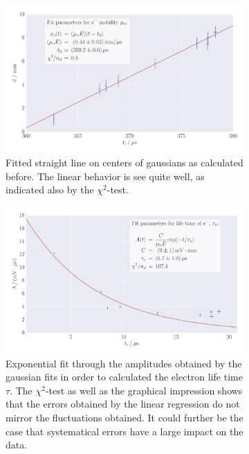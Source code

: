\begin{figure}
    \centering
    \begin{subfigure}[b]{\pltw}
        \includegraphics[width=1.0\textwidth]{figures/haynes_shockley_mu_e_d}
        \caption{
            Fitted straight line on centers of gaussians as calculated before. 
            The linear behavior is see quite well, as indicated also by the 
            $\chi^2$-test.
            }
        \label{fig:h_s_mu_e_d}
    \end{subfigure}
    \begin{subfigure}[b]{\pltw}
        \includegraphics[width=1.0\textwidth]{figures/haynes_shockley_tau_d}
        \caption{
            Exponential fit through the amplitudes obtained by the gaussian fits 
            in order to calculated the electron life time $\tau$. The $\chi^2$-test 
            as well as the graphical impression shows that the errors obtained by the 
            linear regression do not mirror the fluctuations obtained. It could 
            further be the case that systematical errors have a large impact on the 
            data. 
            }
        \label{fig:h_s_tau_d}
    \end{subfigure}
    \caption{
        }
    \label{fig:h_s_mu_e_tau_d}
\end{figure}

